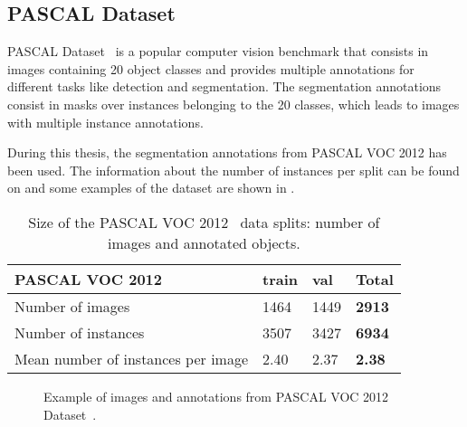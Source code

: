 \subsection{PASCAL Dataset}

PASCAL Dataset~\pascal{} is a popular computer vision benchmark that consists in images containing 20 object classes and provides multiple annotations for different tasks like detection and segmentation.
The segmentation annotations consist in masks over instances belonging to the 20 classes, which leads to images with multiple instance annotations.

During this thesis, the segmentation annotations from PASCAL VOC 2012 has been used.
The information about the number of instances per split can be found on  and some examples of the dataset are shown in .

\begin{table}[h]
  \centering
  \begin{tabular}{l|ll|l}
  \toprule
  PASCAL VOC 2012                    & train & val  & \textbf{Total} \\
  \midrule
  Number of images                   & 1464  & 1449 & \textbf{2913}  \\
  Number of instances                & 3507  & 3427 & \textbf{6934}  \\
  Mean number of instances per image & 2.40  & 2.37 & \textbf{2.38}  \\
  \bottomrule
  \end{tabular}
  \caption{Size of the PASCAL VOC 2012~\pascal{} data splits: number of images and annotated objects.}
  \label{tab:datasets:pascal}
\end{table}


\begin{figure}[h]
  \centering
  \caption{Example of images and annotations from PASCAL VOC 2012 Dataset~\pascal{}. }
  \label{fig:datasets:pascal}
\end{figure}



